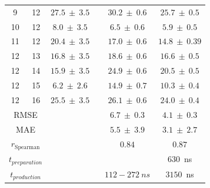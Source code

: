 \begin{table}[h!]
\begin{center}
\begin{adjustbox}{max width=\textwidth}
\begin{tabular}{ | c c |c |c|c|}
        9 &  12 &   $27.5 ~\pm~ 3.5$  ~\cite{Rizzo2006}  &  $30.2 ~\pm~ 0.6$ &  $ 25.7 ~\pm~ 0.5 $\\
        10 &  12 &   $ 8.0 ~\pm~ 3.5$  ~\cite{Rizzo2006}  &  $ 6.5 ~\pm~ 0.6$ &  $  5.9 ~\pm~ 0.5 $\\
        11 &  12 &   $20.4  ~\pm~ 3.5$  ~\cite{Wolfenden1987,Rizzo2006}&  $17.0 ~\pm~ 0.6$ &  $ 14.8 ~\pm~ 0.39 $\\
        12 &  13 &   $16.8 ~\pm~ 3.5$  ~\cite{Rizzo2006} &  $18.6 ~\pm~ 0.6$ &  $ 16.6 ~\pm~ 0.5 $\\
        12 &  14 &   $15.9 ~\pm~ 3.5$  ~\cite{Rizzo2006}&  $24.9 ~\pm~ 0.6$ &  $ 20.5 ~\pm~ 0.5 $\\
        12 &  15 &    $6.2 ~\pm~ 2.6$  ~\cite{Rizzo2006, Nicholls2008}  &  $14.9 ~\pm~ 0.7$ &  $ 10.3 ~\pm~ 0.4 $\\
        12 &  16 &   $25.5 ~\pm~ 3.5$  ~\cite{Rizzo2006} &  $26.1 ~\pm~ 0.6$ &   $ 24.0 ~\pm~ 0.4 $\\
  \hline
        \multicolumn{2}{|c|}{RMSE} &          & $6.7 ~\pm~ 0.3$ & $4.1 ~\pm~ 0.3 $\\
        \multicolumn{2}{|c|}{MAE} &           & $5.5 ~\pm~ 3.9$ & $3.1 ~\pm~ 2.7$ \\
        \multicolumn{2}{|c|}{$r_{\text{Spearman}}$} &  & $0.84$ & $0.87$  \\
        \multicolumn{2}{|c|}{$t_{preparation}$} & & &  $630$~ns \\
        \multicolumn{2}{|c|}{$t_{production}$} & &$112 - 272~ns$ &  $3150$~ns \\
        \hline
\end{tabular}
\end{adjustbox}
\end{center}
\label{SITab: FE_M030_Graph}
\end{table}
\clearpage

